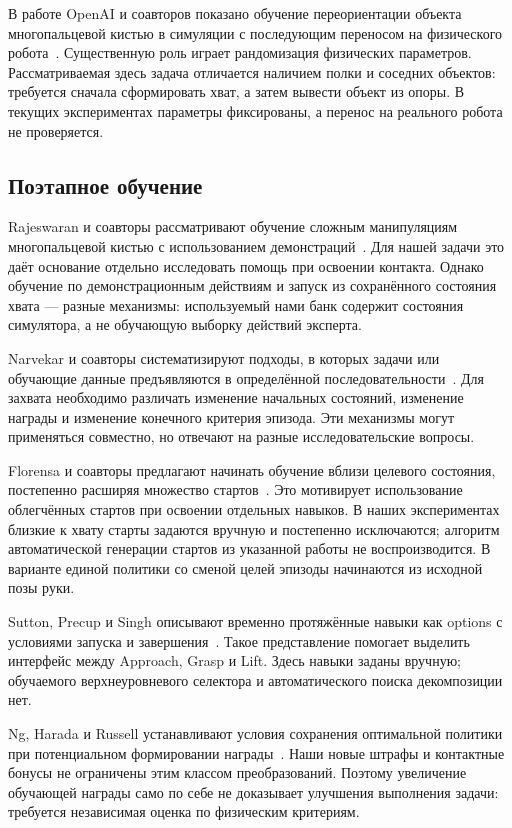 \documentclass{misisarticle}
\begin{document}
В работе OpenAI и соавторов показано обучение переориентации объекта многопальцевой кистью в симуляции с последующим переносом на физического робота~\cite{dexterous}. Существенную роль играет рандомизация физических параметров. Рассматриваемая здесь задача отличается наличием полки и соседних объектов: требуется сначала сформировать хват, а затем вывести объект из опоры. В текущих экспериментах параметры фиксированы, а перенос на реального робота не проверяется.

\subsection{Поэтапное обучение}
Rajeswaran и соавторы рассматривают обучение сложным манипуляциям многопальцевой кистью с использованием демонстраций~\cite{dapg}. Для нашей задачи это даёт основание отдельно исследовать помощь при освоении контакта. Однако обучение по демонстрационным действиям и запуск из сохранённого состояния хвата --- разные механизмы: используемый нами банк содержит состояния симулятора, а не обучающую выборку действий эксперта.

Narvekar и соавторы систематизируют подходы, в которых задачи или обучающие данные предъявляются в определённой последовательности~\cite{curriculum}. Для захвата необходимо различать изменение начальных состояний, изменение награды и изменение конечного критерия эпизода. Эти механизмы могут применяться совместно, но отвечают на разные исследовательские вопросы.

Florensa и соавторы предлагают начинать обучение вблизи целевого состояния, постепенно расширяя множество стартов~\cite{reverse}. Это мотивирует использование облегчённых стартов при освоении отдельных навыков. В наших экспериментах близкие к хвату старты задаются вручную и постепенно исключаются; алгоритм автоматической генерации стартов из указанной работы не воспроизводится. В варианте единой политики со сменой целей эпизоды начинаются из исходной позы руки.

Sutton, Precup и Singh описывают временно протяжённые навыки как options с условиями запуска и завершения~\cite{options}. Такое представление помогает выделить интерфейс между Approach, Grasp и Lift. Здесь навыки заданы вручную; обучаемого верхнеуровневого селектора и автоматического поиска декомпозиции нет.

Ng, Harada и Russell устанавливают условия сохранения оптимальной политики при потенциальном формировании награды~\cite{shaping}. Наши новые штрафы и контактные бонусы не ограничены этим классом преобразований. Поэтому увеличение обучающей награды само по себе не доказывает улучшения выполнения задачи: требуется независимая оценка по физическим критериям.
\end{document}

